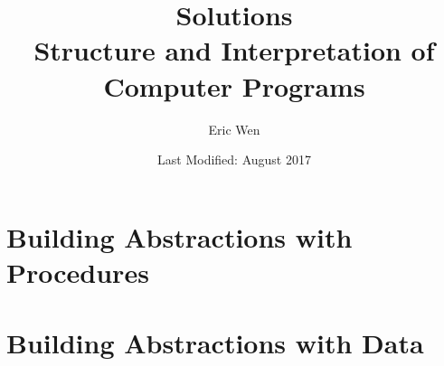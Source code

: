 \documentclass[a4paper]{report}
\begin{document}
\title{Solutions \\
\large Structure and Interpretation of Computer Programs}
\author{Eric Wen}
\date{Last Modified: August 2017}
\maketitle

\begin{multicols}{2}
  \tableofcontents
\end{multicols}

%
%

\chapter{Building Abstractions with Procedures}



%
%

\chapter{Building Abstractions with Data}


\end{document}
